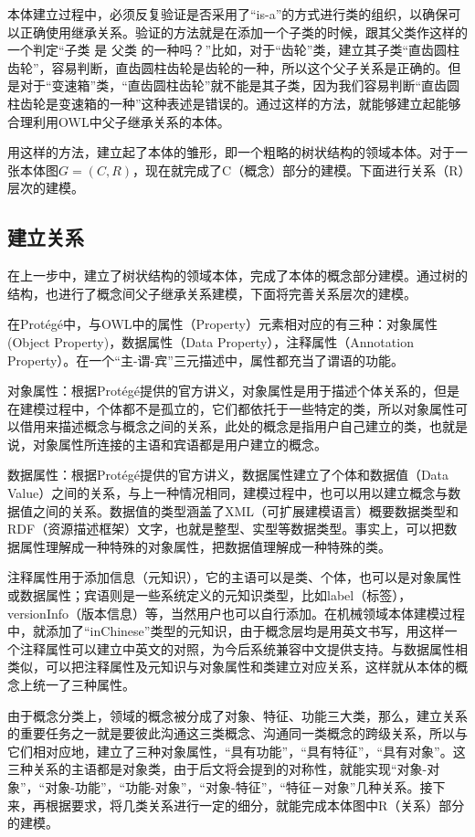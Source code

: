 \documentclass[12pt,a4paper]{article}
\begin{document}
	本体建立过程中，必须反复验证是否采用了“is-a”的方式进行类的组织，以确保可以正确使用继承关系。验证的方法就是在添加一个子类的时候，跟其父类作这样的一个判定“子类 是 父类 的一种吗？”比如，对于“齿轮”类，建立其子类“直齿圆柱齿轮”，容易判断，直齿圆柱齿轮是齿轮的一种，所以这个父子关系是正确的。但是对于“变速箱”类，“直齿圆柱齿轮”就不能是其子类，因为我们容易判断“直齿圆柱齿轮是变速箱的一种”这种表述是错误的。通过这样的方法，就能够建立起能够合理利用OWL中父子继承关系的本体。
	
	用这样的方法，建立起了本体的雏形，即一个粗略的树状结构的领域本体。对于一张本体图$ G=(C,R) $，现在就完成了C（概念）部分的建模。下面进行关系（R）层次的建模。
	
	\subsection{建立关系}
	在上一步中，建立了树状结构的领域本体，完成了本体的概念部分建模。通过树的结构，也进行了概念间父子继承关系建模，下面将完善关系层次的建模。
	
	在Prot{\'e}g{\'e}中，与OWL中的属性（Property）元素相对应的有三种：对象属性(Object Property)，数据属性（Data Property），注释属性（Annotation Property）。在一个“主-谓-宾”三元描述中，属性都充当了谓语的功能。
	
	对象属性：根据Prot{\'e}g{\'e}提供的官方讲义，对象属性是用于描述个体关系的，但是在建模过程中，个体都不是孤立的，它们都依托于一些特定的类，所以对象属性可以借用来描述概念与概念之间的关系，此处的概念是指用户自己建立的类，也就是说，对象属性所连接的主语和宾语都是用户建立的概念。
	
	数据属性：根据Prot{\'e}g{\'e}提供的官方讲义，数据属性建立了个体和数据值（Data Value）之间的关系，与上一种情况相同，建模过程中，也可以用以建立概念与数据值之间的关系。数据值的类型涵盖了XML（可扩展建模语言）概要数据类型和RDF（资源描述框架）文字，也就是整型、实型等数据类型。事实上，可以把数据属性理解成一种特殊的对象属性，把数据值理解成一种特殊的类。
	
	注释属性用于添加信息（元知识），它的主语可以是类、个体，也可以是对象属性或数据属性；宾语则是一些系统定义的元知识类型，比如label（标签），versionInfo（版本信息）等，当然用户也可以自行添加。在机械领域本体建模过程中，就添加了“inChinese”类型的元知识，由于概念层均是用英文书写，用这样一个注释属性可以建立中英文的对照，为今后系统兼容中文提供支持。与数据属性相类似，可以把注释属性及元知识与对象属性和类建立对应关系，这样就从本体的概念上统一了三种属性。
	
	由于概念分类上，领域的概念被分成了对象、特征、功能三大类，那么，建立关系的重要任务之一就是要彼此沟通这三类概念、沟通同一类概念的跨级关系，所以与它们相对应地，建立了三种对象属性，“具有功能”，“具有特征”，“具有对象”。这三种关系的主语都是对象类，由于后文将会提到的对称性，就能实现“对象-对象”，“对象-功能”，“功能-对象”，“对象-特征”，“特征－对象”几种关系。接下来，再根据要求，将几类关系进行一定的细分，就能完成本体图中R（关系）部分的建模。
	
\end{document}
